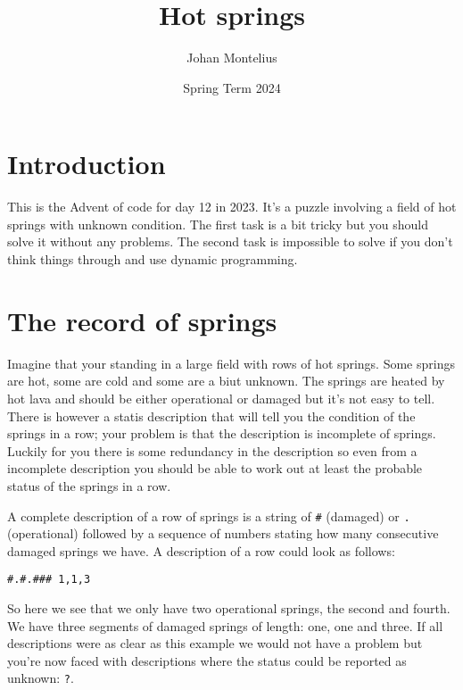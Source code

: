 \documentclass[a4paper,11pt]{article}
\begin{document}
\title{Hot springs}

\author{Johan Montelius}
\date{Spring Term 2024}

\maketitle


\section*{Introduction}

This is the Advent of code for day 12 in 2023. It's a puzzle involving
a field of hot springs with unknown condition. The first task is a bit
tricky but you should solve it without any problems. The second task
is impossible to solve if you don't think things through and use
dynamic programming.


\section{The record of springs}

Imagine that your standing in a large field with rows of hot
springs. Some springs are hot, some are cold and some are a biut
unknown. The springs are heated by hot lava and should be either
operational or damaged but it's not easy to tell. There is however a
statis description that will tell you the condition of the springs in
a row; your problem is that the description is incomplete of
springs. Luckily for you there is some redundancy in the description
so even from a incomplete description you should be able to work out
at least the probable status of the springs in a row.

A complete description of a row of springs is a string of {\tt \#}
(damaged) or {\tt .} (operational) followed by a sequence of numbers
stating how many consecutive damaged springs we have. A
description of a row could look as follows:

\begin{verbatim}
#.#.### 1,1,3
\end{verbatim}

So here we see that we only have two operational springs, the second
and fourth. We have three segments of damaged springs of length: one,
one and three. If all descriptions were as clear as this example we
would not have a problem but you're now faced with descriptions where
the status could be reported as unknown: {\tt ?}.
\end{document}
